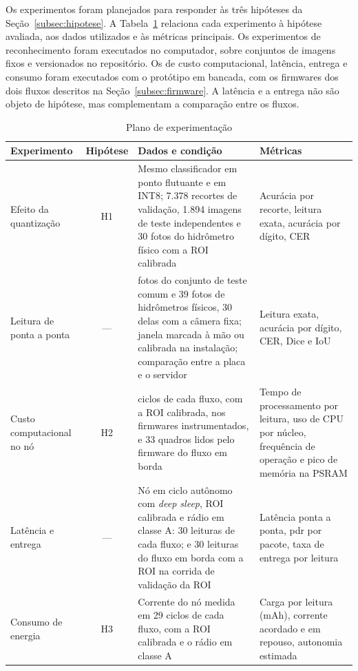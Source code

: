 Os experimentos foram planejados para responder às três hipóteses da
Seção~\ref{subsec:hipotese}. A Tabela~\ref{tab:plano_experimentos} relaciona cada
experimento à hipótese avaliada, aos dados utilizados e às métricas principais. Os
experimentos de reconhecimento foram executados no computador, sobre conjuntos de imagens
fixos e versionados no repositório. Os de custo computacional, latência, entrega e consumo
foram executados com o protótipo em bancada, com os firmwares dos dois fluxos descritos na
Seção~\ref{subsec:firmware}. A latência e a entrega não são objeto de hipótese, mas
complementam a comparação entre os fluxos.

\begin{table}[H]
    \centering
    \caption{Plano de experimentação}
    \label{tab:plano_experimentos}
    \begin{tabularx}{\textwidth}{@{}>{\raggedright\arraybackslash}p{3.1cm}c>{\raggedright\arraybackslash}X>{\raggedright\arraybackslash}p{3.6cm}@{}}
        \toprule
        \textbf{Experimento} & \textbf{Hipótese} & \textbf{Dados e condição} & \textbf{Métricas} \\
        \midrule
        Efeito da quantização & H1 & Mesmo classificador em ponto flutuante e em INT8; 7.378
        recortes de validação, 1.894 imagens de teste independentes e 30 fotos do hidrômetro
        físico com a ROI calibrada & Acurácia por recorte, leitura exata, acurácia por dígito,
        CER \\
        \addlinespace
        Leitura de ponta a ponta & --- & 39 fotos do conjunto de teste comum e 39 fotos de
        hidrômetros físicos, 30 delas com a câmera fixa; janela marcada à
        mão ou calibrada na instalação; comparação entre a placa e o servidor & Leitura exata,
        acurácia por dígito, CER, Dice e IoU \\
        \addlinespace
        Custo computacional no nó & H2 & 30 ciclos de cada fluxo, com a ROI calibrada, nos
        firmwares instrumentados, e 33 quadros lidos pelo firmware do fluxo em borda & Tempo de
        processamento por leitura, uso de CPU por núcleo, frequência de operação e pico de
        memória na PSRAM \\
        \addlinespace
        Latência e entrega & --- & Nó em ciclo autônomo com \textit{deep sleep}, ROI calibrada e
        rádio em classe A: 30 leituras de cada fluxo; e 30 leituras do fluxo em borda com a
        ROI na corrida de validação da ROI & Latência ponta a ponta, \gls{pdr} por pacote, taxa de entrega por leitura \\
        \addlinespace
        Consumo de energia & H3 & Corrente do nó medida em 29 ciclos de cada fluxo, com a ROI
        calibrada e o rádio em classe A & Carga por leitura (mAh), corrente acordado e em
        repouso, autonomia estimada \\
        \bottomrule
    \end{tabularx}
\end{table}

